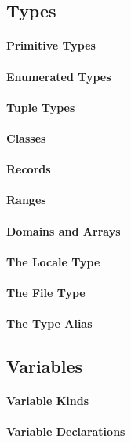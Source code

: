 \subsection{Types}
\paragraph{Primitive Types}
\paragraph{Enumerated Types}
\paragraph{Tuple Types}
\paragraph{Classes}
\paragraph{Records}
\paragraph{Ranges}
\paragraph{Domains and Arrays}
\paragraph{The Locale Type}
\paragraph{The File Type}
\paragraph{The Type Alias}

\subsection{Variables}
\paragraph{Variable Kinds}
\paragraph{Variable Declarations}
